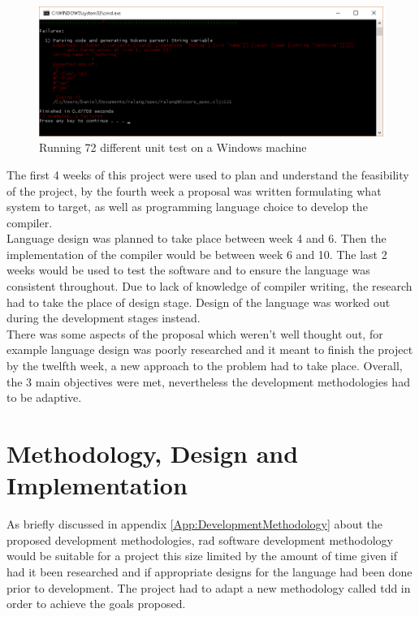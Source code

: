 \documentclass[a4paper]{article}
\begin{document}
	\begin{figure}[h!]
		\centering
		\includegraphics[width=\linewidth]{images/unit_test_results.png}
		\caption[Running 72 different unit test on Windows 10 32-bit]{Running 72 different unit test on a Windows machine}
		\label{fig:unit_test_results}
	\end{figure}
	The first 4 weeks of this project were used to plan and understand the feasibility of the project, by the fourth week a proposal was written formulating what system to target, as well as programming language choice to develop the compiler.\\
	
	Language design was planned to take place between week 4 and 6. Then the implementation of the compiler  would be between week 6 and 10. The last 2 weeks would be used to test the software and to ensure the language was consistent throughout. Due to lack of knowledge of compiler writing, the research had to take the place of design stage. Design of the language was worked out during the development stages instead.\\
	
	There was some aspects of the proposal which weren't well thought out, for example language design was poorly researched and it meant to finish the project by the twelfth week, a new approach to the problem had to take place. Overall, the 3 main objectives were met, nevertheless the development methodologies had to be adaptive.
	\newpage
	\section{Methodology, Design and Implementation}
	\label{Sec:MDI}
	As briefly discussed in appendix \ref{App:DevelopmentMethodology} about the proposed development methodologies, \ac{rad} software development methodology would be suitable for a project this size limited by the amount of time given if had it been researched and if appropriate designs for the language had been done prior to development. The project had to adapt a new methodology called \ac{tdd} in order to achieve the goals proposed. \\
	
\end{document}
